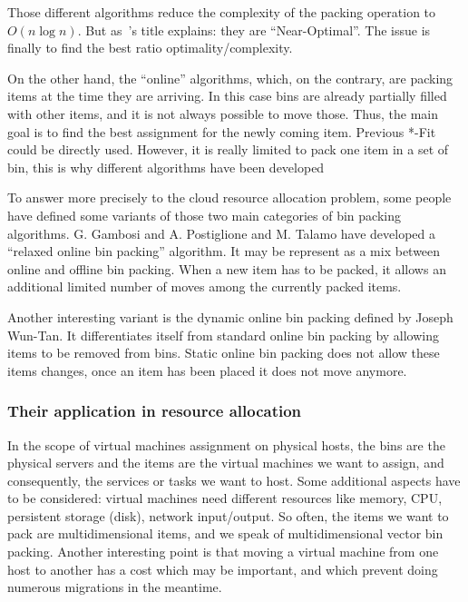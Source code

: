 \documentclass[a4paper,11pt]{article}
\begin{document}
Those different algorithms reduce the complexity of the packing operation to
$O(n\log{n})$. But as~\cite{maths:bpheuristics}'s title explains: they are
“Near-Optimal”. The issue is finally to find the best ratio optimality/complexity.

On the other hand, the “online” algorithms, which, on the contrary, are packing
items at the time they are arriving. In this case bins are already partially
filled with other items, and it is not always possible to move those. Thus, the
main goal is to find the best assignment for the newly coming item. Previous
*-Fit could be directly used. However, it is really limited to pack one item in
a set of bin, this is why different algorithms have been developed

To answer more precisely to the cloud resource allocation problem, some people
have defined some variants of those two main categories of bin packing
algorithms. G. Gambosi and A. Postiglione and M. Talamo have developed a
“relaxed online bin packing” algorithm\cite{maths:relaxedonlinebp}. It may be
represent as a mix between online and offline bin packing. When a new item has
to be packed, it allows an additional limited number of moves among the
currently packed items.

Another interesting variant is the dynamic online bin packing defined by Joseph
Wun-Tan.  It differentiates itself from standard online bin packing by allowing
items to be removed from bins. Static online bin packing does not allow these
items changes, once an item has been placed it does not move anymore.

\subsubsection{Their application in resource allocation}

In the scope of virtual machines assignment on physical hosts, the bins are the
physical servers and the items are the virtual machines we want to assign,
and consequently, the services or tasks we want to host. Some additional aspects
have to be considered: virtual machines need different resources like memory,
CPU, persistent storage (disk), network input/output. So often, the items we
want to pack are multidimensional items, and we speak of multidimensional
vector bin packing. Another interesting point is that moving a virtual machine
from one host to another has a cost which may be important, and which prevent 
doing numerous migrations in the meantime.
\end{document}
